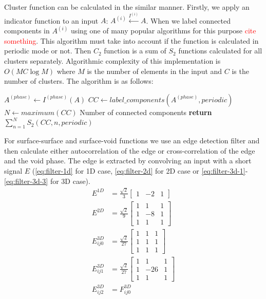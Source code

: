 \documentclass[reprint,amsmath,amssymb,aps,pre,showkeys,showpacs,nofootinbib]{revtex4-1}
\begin{document}
Cluster function can be calculated in the similar manner. Firstly, we apply an
indicator function to an input $A$: $A^{(i)} \xleftarrow{I^{(i)}} A$. When we
label connected components in $A^{(i)}$ using one of many popular algorithms for
this purpose \textcolor{red}{cite something}. This algorithm must take into
account if the function is calculated in periodic mode or not. Then $C_2$
function is a sum of $S_2$ functions calculated for all clusters
separately. Algorithmic complexity of this implementation is $O(MC \log M)$
where $M$ is the number of elements in the input and $C$ is the number of
clusters. The algorithm is as follows:
\begin{algorithmic}[1]
  \State $A^{(phase)} \gets I^{(phase)} (A)$
  \State $CC \gets label\_components(A^{(phase)}, periodic)$
  \State $N \gets maximum(CC)$ \Comment Number of connected components
  \State \textbf{return} $\sum_{n=1}^N S_2(CC, n, periodic)$
  \EndProcedure
\end{algorithmic}

For surface-surface and surface-void functions we use an edge detection filter
and then calculate either autocorrelation of the edge or cross-correlation of
the edge and the void phase. The edge is extracted by convolving an input with a
short signal $E$ (\cref{eq:filter-1d} for 1D case, \cref{eq:filter-2d} for 2D case or
\cref{eq:filter-3d-1}-\cref{eq:filter-3d-3} for 3D case).
\begin{align}
  E^{1D} &= \frac{\sqrt{2}}{3} \left[
    \begin{array}{ccc}
        1 & -2 & 1
      \end{array}
    \right] \label{eq:filter-1d} \\
  E^{2D} &= \frac{\sqrt{2}}{9} \left[
    \begin{array}{ccc}
        1 & 1 & 1 \\
        1 & -8 & 1 \\
        1 & 1 & 1
      \end{array}
    \right] \label{eq:filter-2d} \\
  E^{3D}_{ij0} &= \frac{\sqrt{2}}{27} \left[
    \begin{array}{ccc}
        1 & 1 & 1 \\
        1 & 1 & 1 \\
        1 & 1 & 1
    \end{array}
    \right] \label{eq:filter-3d-1} \\
  E^{3D}_{ij1} &= \frac{\sqrt{2}}{27} \left[
    \begin{array}{ccc}
      1 & 1 & 1 \\
      1 & -26 & 1 \\
      1 & 1 & 1
    \end{array}
    \right] \label{eq:filter-3d-2} \\
  E^{3D}_{ij2} &= F^{3D}_{ij0} \label{eq:filter-3d-3}
\end{align}
\end{document}
